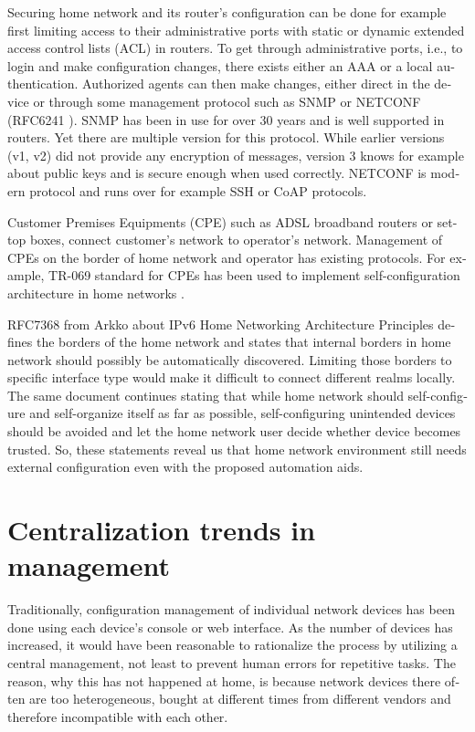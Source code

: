 \documentclass[12pt,a4paper,english]{tutthesis}
\begin{document}
\begin{otherlanguage}{english}
Securing home network and its router's configuration can be done for
example first limiting access to their administrative ports
with static or dynamic extended access control lists (ACL) in
routers. To get through administrative ports, i.e., to login and make
configuration changes, there exists either an AAA or a local authentication.
Authorized agents can then make changes, either direct in the device
or through some management protocol such as SNMP or NETCONF (RFC6241
\cite{rfc6241}).  SNMP has been in use for over 30 years and is well
supported in routers. Yet there are multiple version for this
protocol. While earlier versions (v1, v2) did not provide any
encryption of messages, version 3 knows for example about public keys
and is secure enough when used correctly. NETCONF is modern protocol
and runs over for example SSH or CoAP protocols.


Customer Premises Equipments (CPE) such as ADSL broadband routers or
set-top boxes, connect customer's network to operator's network.
Management of CPEs on the border of home network and operator has 
existing protocols. For example, TR-069 standard \cite{iptvtr069} for CPEs
has been used to implement self-configuration archi\-tecture in
home networks \cite{tr069rachidi2011}.


RFC7368 \cite{rfc7368} from Arkko about IPv6 Home Networking Architecture Principles 
defines the borders of the home network and states that
internal borders in home network should possibly be automatically
discovered. Limiting those borders to specific
interface type would make it difficult to connect different realms locally.
The same document continues stating
that while home network should self-configure and self-organize itself as
far as possible, self-configuring unintended devices should be
avoided and let the home network user decide whether device becomes trusted.
So, these statements reveal us that home network environment still needs
external configuration even with the proposed automation aids.

\section{Centralization trends in management}
\label{sec-3-2}

Traditionally, configuration management of individual network devices has been done
using each device's console or web interface.  As the number of
devices has increased, it would have been reasonable to rationalize
the process by utilizing a central management, not least to prevent human
errors for repetitive tasks.  The reason, why this has not happened at
home, is because network devices there often are too heterogeneous, bought at different times from different vendors
and therefore incompatible with each other.


\end{otherlanguage}
\end{document}

